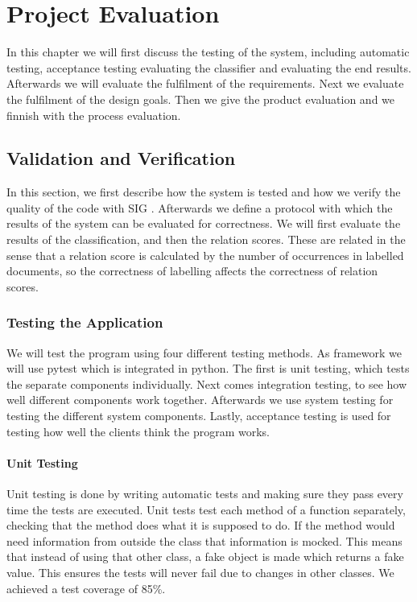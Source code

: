 \chapter{Project Evaluation}\label{sec:project-evaluation}
In this chapter we will first discuss the testing of the system, including automatic testing, acceptance testing evaluating the classifier and evaluating the end results. Afterwards we will evaluate the fulfilment of the requirements. Next we evaluate the fulfilment of the design goals. Then we give the product evaluation and we finnish with the process evaluation.

\section{Validation and Verification}
In this section, we first describe how the system is tested and how we verify the quality of the code with SIG \cite{sig}. Afterwards we define a protocol with which the results of the system can be evaluated for correctness. We will first evaluate the results of the classification, and then the relation scores. These are related in the sense that a relation score is calculated by the number of occurrences in labelled documents, so the correctness of labelling affects the correctness of relation scores.\\

\subsection{Testing the Application}
We will test the program using four different testing methods. As framework we will use pytest\cite{pytest} which is integrated in python. The first is unit testing, which tests the separate components individually. Next comes integration testing, to see how well different components work together. Afterwards we use system testing for testing the different system components. Lastly, acceptance testing is used for testing how well the clients think the program works.

\subsubsection{Unit Testing}
Unit testing is done by writing automatic tests and making sure they pass every time the tests are executed. Unit tests test each method of a function separately, checking that the method does what it is supposed to do. If the method would need information from outside the class that information is mocked. This means that instead of using that other class, a fake object is made which returns a fake value. This ensures the tests will never fail due to changes in other classes. We achieved a test coverage of 85\%.


